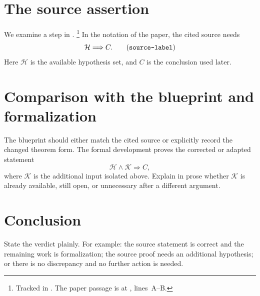 \documentclass{article}
\begin{document}
\section{The source assertion}

We examine a step in \cite{SourcePaper}.%
\footnote{Tracked in . The paper passage is at
, lines~A--B.}
In the notation of the paper, the cited source needs
\[
  \mathcal H \Longrightarrow C.
  \tag{\texttt{source-label}}
\]
Here $\mathcal H$ is the available hypothesis set, and $C$ is the conclusion
used later.

\section{Comparison with the blueprint and formalization}

The blueprint should either match the cited source or explicitly record the
changed theorem form.  The formal development proves the corrected or adapted
statement
\[
  \mathcal H \land \mathcal K \Longrightarrow C,
\]
where $\mathcal K$ is the additional input isolated above.  Explain in prose
whether $\mathcal K$ is already available, still open, or unnecessary after a
different argument.

\section{Conclusion}

State the verdict plainly.  For example: the source statement is correct and the
remaining work is formalization; the source proof needs an additional
hypothesis; or there is no discrepancy and no further action is needed.



\end{document}
